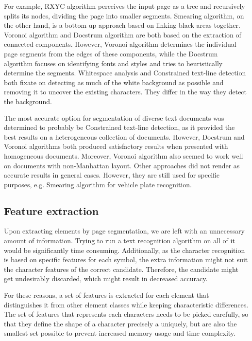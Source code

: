 For example, RXYC algorithm perceives the input page as a tree and recursively splits its nodes, dividing the page into smaller segments. Smearing algorithm, on the other hand, is a bottom-up approach based on linking black areas together. Voronoi algorithm and Docstrum algorithm are both based on the extraction of connected components. However, Voronoi algorithm determines the individual page segments from the edges of these components, while the Docstrum algorithm focuses on identifying fonts and styles and tries to heuristically determine the segments. Whitespace analysis and Constrained text-line detection both fixate on detecting as much of the white background as possible and removing it to uncover the existing characters. They differ in the way they detect the background.

The most accurate option for segmentation of diverse text documents was determined to probably be Constrained text-line detection, as it provided the best results on a heterogeneous collection of documents. However, Docstrum and Voronoi algorithms both produced satisfactory results when presented with homogeneous documents. Moreover, Voronoi algorithm also seemed to work well on documents with non-Manhattan layout. Other approaches did not render as accurate results in general cases. However, they are still used for specific purposes, e.g. Smearing algorithm for vehicle plate recognition.

\subsection{Feature extraction}

Upon extracting elements by page segmentation, we are left with an unnecessary amount of information. Trying to run a text recognition algorithm on all of it would be significantly time consuming. Additionally, as the character recognition is based on specific features for each symbol, the extra information might not suit the character features of the correct candidate. Therefore, the candidate might get undesirably discarded, which might result in decreased accuracy.

For these reasons, a set of features is extracted for each element that distinguishes it from other element classes while keeping characteristic differences. The set of features that represents each characters needs to be picked carefully, so that they define the shape of a character precisely a uniquely, but are also the smallest set possible to prevent increased memory usage and time complexity.

